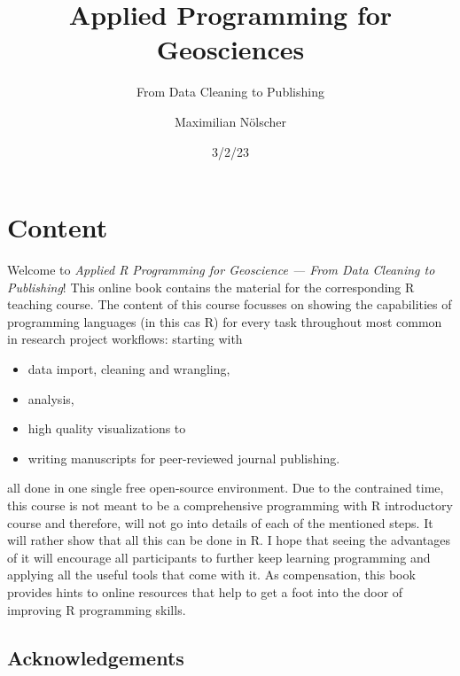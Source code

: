 \documentclass[
  letterpaper,
  DIV=11,
  numbers=noendperiod]{scrreprt}
\title{Applied Programming for Geosciences}
\subtitle{From Data Cleaning to Publishing}
\author{Maximilian Nölscher}
\date{3/2/23}
\providecommand{\tightlist}{%
  \setlength{\itemsep}{0pt}\setlength{\parskip}{0pt}}\usepackage{longtable,booktabs,array}
\renewcommand*\contentsname{Table of contents}
\newcommand\contentsname{Table of contents}
\begin{document}
\maketitle
\ifdefined\Shaded\renewenvironment{Shaded}{\begin{tcolorbox}[interior hidden, frame hidden, borderline west={3pt}{0pt}{shadecolor}, boxrule=0pt, sharp corners, breakable, enhanced]}{\end{tcolorbox}}\fi

\renewcommand*\contentsname{Table of contents}
{
\hypersetup{linkcolor=}
\setcounter{tocdepth}{2}
\tableofcontents
}

\hypertarget{content}{%
\chapter*{Content}\label{content}}


Welcome to \emph{Applied R Programming for Geoscience --- From Data
Cleaning to Publishing}! This online book contains the material for the
corresponding R teaching course. The content of this course focusses on
showing the capabilities of programming languages (in this cas R) for
every task throughout most common in research project workflows:
starting with

\begin{itemize}
\tightlist
\item
  data import, cleaning and wrangling,
\item
  analysis,
\item
  high quality visualizations to
\item
  writing manuscripts for peer-reviewed journal publishing.
\end{itemize}

all done in one single free open-source environment. Due to the
contrained time, this course is not meant to be a comprehensive
programming with R introductory course and therefore, will not go into
details of each of the mentioned steps. It will rather show that all
this can be done in R. I hope that seeing the advantages of it will
encourage all participants to further keep learning programming and
applying all the useful tools that come with it. As compensation, this
book provides hints to online resources that help to get a foot into the
door of improving R programming skills.

\hypertarget{acknowledgements}{%
\section*{Acknowledgements}\label{acknowledgements}}
\end{document}
